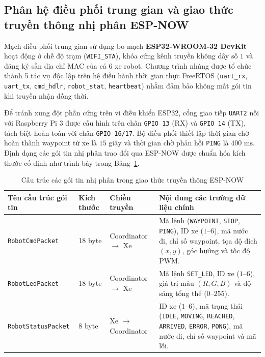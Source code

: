 \documentclass[12pt,a4paper]{report}
\newcommand{\tablefont}{\fontsize{12pt}{15pt}\selectfont}
\begin{document}
	\subsection{Phân hệ điều phối trung gian và giao thức truyền thông nhị phân ESP-NOW}
	Mạch điều phối trung gian sử dụng bo mạch \textbf{ESP32-WROOM-32 DevKit} hoạt động ở chế độ trạm (\texttt{WIFI\_STA}), khóa cứng kênh truyền không dây số $1$ và đăng ký sẵn địa chỉ MAC của cả 6 xe robot. Chương trình nhúng được tổ chức thành 5 tác vụ độc lập trên hệ điều hành thời gian thực FreeRTOS (\texttt{uart\_rx}, \texttt{uart\_tx}, \texttt{cmd\_hdlr}, \texttt{robot\_stat}, \texttt{heartbeat}) nhằm đảm bảo không mất gói tin khi truyền nhận đồng thời.
	
	Để tránh xung đột phần cứng trên vi điều khiển ESP32, cổng giao tiếp \texttt{UART2} nối với Raspberry Pi 3 được cấu hình trên chân \texttt{GPIO 13} (RX) và \texttt{GPIO 14} (TX), tách biệt hoàn toàn với chân \texttt{GPIO 16/17}. Bộ điều phối thiết lập thời gian chờ hoàn thành waypoint từ xe là $15\text{ giây}$ và thời gian chờ phản hồi \texttt{PING} là $400\text{ ms}$. Định dạng các gói tin nhị phân trao đổi qua ESP-NOW được chuẩn hóa kích thước cố định như trình bày trong Bảng~\ref{tab:goi_tin_espnow}.
	
	\begin{table}[h!]
		\centering
		\tablefont
		\caption{Cấu trúc các gói tin nhị phân trong giao thức truyền thông ESP-NOW}
		\label{tab:goi_tin_espnow}
		\renewcommand{\arraystretch}{1.25}
		\begin{tabular}{|p{3.3cm}|p{1.7cm}|p{2.3cm}|p{6.0cm}|}
			\hline
			\textbf{Tên cấu trúc gói tin} & \textbf{Kích thước} & \textbf{Chiều truyền} & \textbf{Nội dung các trường dữ liệu chính} \\
			\hline
			\texttt{RobotCmdPacket} & 18 byte & Coordinator $\rightarrow$ Xe & Mã lệnh (\texttt{WAYPOINT}, \texttt{STOP}, \texttt{PING}), ID xe ($1\text{--}6$), mã nước đi, chỉ số waypoint, tọa độ đích $(x, y)$, góc hướng và tốc độ PWM. \\
			\hline
			\texttt{RobotLedPacket} & 18 byte & Coordinator $\rightarrow$ Xe & Mã lệnh \texttt{SET\_LED}, ID xe ($1\text{--}6$), giá trị màu $(R, G, B)$ và độ sáng tổng thể ($0\text{--}255$). \\
			\hline
			\texttt{RobotStatusPacket} & 8 byte & Xe $\rightarrow$ Coordinator & ID xe ($1\text{--}6$), mã trạng thái (\texttt{IDLE}, \texttt{MOVING}, \texttt{REACHED}, \texttt{ARRIVED}, \texttt{ERROR}, \texttt{PONG}), mã nước đi, chỉ số waypoint và mã lỗi. \\
			\hline
		\end{tabular}
	\end{table}
	
\end{document}
